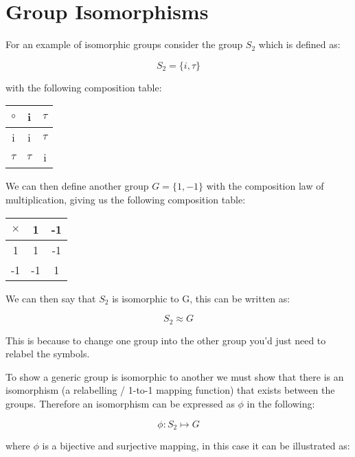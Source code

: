 \documentclass{article}
\begin{document}
\section{Group Isomorphisms}

For an example of isomorphic groups consider the group $S_{2}$ which is defined as:

\[ S_{2} = \{ i, \tau \} \]

with the following composition table:

\begin{center}
\begin{tabular}{ |c|c c| } 
 \hline
 $\circ$ & i & $\tau$ \\
 \hline
 i & i & $\tau$ \\
 $\tau$ & $\tau$ & i \\
 \hline
\end{tabular}
\end{center}

We can then define another group \( G = \{ 1, -1 \} \) with the composition law of multiplication, giving us the following composition table:

\begin{center}
\begin{tabular}{ |c|c c| } 
 \hline
 $\times$ & 1 & -1 \\
 \hline
 1 & 1 & -1 \\
 -1 & -1 & 1 \\
 \hline
\end{tabular}
\end{center}

We can then say that $S_{2}$ is isomorphic to G, this can be written as:

\[ S_{2} \approx G \]

This is because to change one group into the other group you'd just need to relabel the symbols.

To show a generic group is isomorphic to another we must show that there is an isomorphism (a relabelling / 1-to-1 mapping function) that exists between the groups. Therefore an isomorphism can be expressed as $\phi$ in the following:

\[ \phi : S_{2} \mapsto G \]

where $\phi$ is a bijective and surjective mapping, in this case it can be illustrated as:
\end{document}
